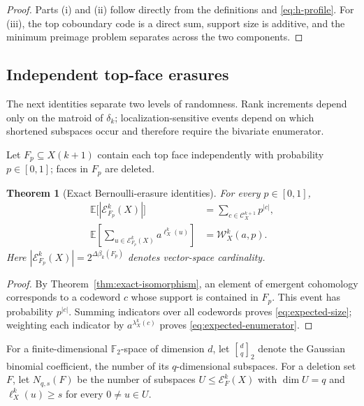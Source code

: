 \documentclass[11pt,letterpaper]{article}
\theoremstyle{plain}
\newtheorem{theorem}{Theorem}[section]
\theoremstyle{definition}
\newcommand{\F}{\mathbb{F}_2}
\newcommand{\E}{\mathbb{E}}
\newcommand{\cC}{\mathcal{C}}
\newcommand{\cE}{\mathcal{E}}
\newcommand{\cW}{\mathcal{W}}
\newcommand{\1}{\mathbf{1}}
\newcommand{\abs}[1]{\left|#1\right|}
\newcommand{\qbinom}[2]{\genfrac{[}{]}{0pt}{}{#1}{#2}_{2}}
\begin{document}
\begin{proof}
Parts (i) and (ii) follow directly from the definitions and
\eqref{eq:h-profile}.  For (iii), the top coboundary code is a direct sum, support size is
additive, and the minimum preimage problem separates across the two components.
\end{proof}

\subsection{Independent top-face erasures}

The next identities separate two levels of randomness.  Rank increments depend only on
the matroid of $\delta_k$; localization-sensitive events depend on which shortened
subspaces occur and therefore require the bivariate enumerator.


Let $F_p\subseteq X(k+1)$ contain each top face independently with probability
$p\in[0,1]$; faces in $F_p$ are deleted.

\begin{theorem}[Exact Bernoulli-erasure identities]\label{thm:random-identities}
For every $p\in[0,1]$,
\begin{align}
 \E\bigl[\abs{\cE_{F_p}^k(X)}\bigr]
 &=\sum_{c\in\cC_X^{k+1}}p^{\abs c},
 \label{eq:expected-size}\\
 \E\left[\sum_{u\in\cE_{F_p}^k(X)}a^{\ell_X^k(u)}\right]
 &=\cW_X^k(a,p).
 \label{eq:expected-enumerator}
\end{align}
Here $\abs{\cE_{F_p}^k(X)}=2^{\Delta\beta_k(F_p)}$ denotes vector-space cardinality.
\end{theorem}

\begin{proof}
By Theorem~\ref{thm:exact-isomorphism}, an element of emergent cohomology corresponds to
a codeword $c$ whose support is contained in $F_p$.  This event has probability
$p^{\abs c}$.  Summing indicators over all codewords proves \eqref{eq:expected-size};
weighting each indicator by $a^{\lambda_X^k(c)}$ proves
\eqref{eq:expected-enumerator}.
\end{proof}

For a finite-dimensional $\F$-space of dimension $d$, let
$\qbinom{d}{q}$ denote the Gaussian binomial coefficient, the number of its
$q$-dimensional subspaces.  For a deletion set $F$, let
$N_{q,s}(F)$ be the number of subspaces $U\le\cE_F^k(X)$ with
$\dim U=q$ and $\ell_X^k(u)\ge s$ for every $0\ne u\in U$.
\end{document}
